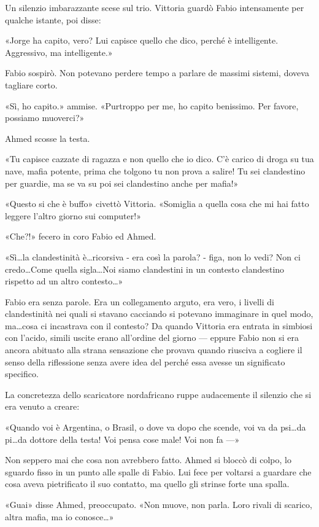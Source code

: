 Un silenzio imbarazzante scese sul trio. Vittoria guardò Fabio intensamente per qualche istante, poi disse:

«Jorge ha capito, vero? Lui capisce quello che dico, perché è intelligente. Aggressivo, ma intelligente.»

Fabio sospirò. Non potevano perdere tempo a parlare de massimi sistemi, doveva tagliare corto.

«Sì, ho capito.» ammise. «Purtroppo per me, ho capito benissimo. Per favore, possiamo muoverci?»

Ahmed scosse la testa.

«Tu capisce cazzate di ragazza e non quello che io dico. C'è carico di droga su tua nave, mafia potente, prima che tolgono tu non prova a salire! Tu sei clandestino per guardie, ma se va su poi sei clandestino anche per mafia!»

«Questo si che è buffo» civettò Vittoria. «Somiglia a quella cosa che mi hai fatto leggere l'altro giorno sui computer!»

«Che?!» fecero in coro Fabio ed Ahmed.

«Sì\ldots la clandestinità è\ldots ricorsiva - era così la parola? - figa, non lo vedi? Non ci credo\ldots Come quella sigla\ldots Noi siamo clandestini in un contesto clandestino rispetto ad un altro contesto\ldots»

Fabio era senza parole. Era un collegamento arguto, era vero, i livelli di clandestinità nei quali si stavano cacciando si potevano immaginare in quel modo, ma\ldots cosa ci incastrava con il contesto? Da quando Vittoria era entrata in simbiosi con l'acido, simili uscite erano all'ordine del giorno --- eppure Fabio non si era ancora abituato alla strana sensazione che provava quando riusciva a cogliere il senso della riflessione senza avere idea del perché essa avesse un significato specifico.

La concretezza dello scaricatore nordafricano ruppe audacemente il silenzio che si era venuto a creare:

«Quando voi è Argentina, o Brasil, o dove va dopo che scende, voi va da psi\ldots da pi\ldots da dottore della testa! Voi pensa cose male! Voi non fa ---»

Non seppero mai che cosa non avrebbero fatto. Ahmed si bloccò di colpo, lo sguardo fisso in un punto alle spalle di Fabio. Lui fece per voltarsi a guardare che cosa aveva pietrificato il suo contatto, ma quello gli strinse forte una spalla.

«Guai» disse Ahmed, preoccupato. «Non muove, non parla. Loro rivali di scarico, altra mafia, ma io conosce\ldots»

